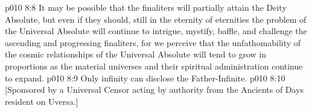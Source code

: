 \vs p010 8:8 It may be possible that the finaliters will partially attain the Deity Absolute, but even if they should, still in the eternity of eternities the problem of the Universal Absolute will continue to intrigue, mystify, baffle, and challenge the ascending and progressing finaliters, for we perceive that the unfathomability of the cosmic relationships of the Universal Absolute will tend to grow in proportions as the material universes and their spiritual administration continue to expand.
\vs p010 8:9 \pc Only infinity can disclose the Father\hyp{}Infinite.
\vsetoff
\vs p010 8:10 [Sponsored by a Universal Censor acting by authority from the Ancients of Days resident on Uversa.]
